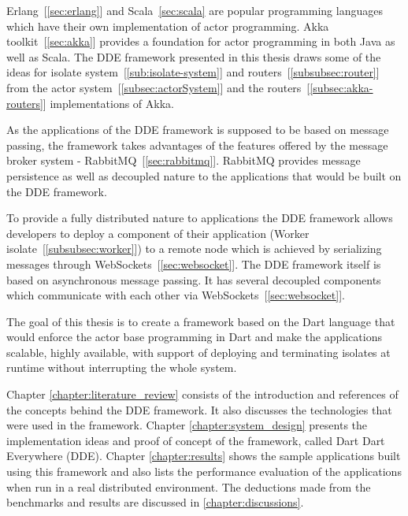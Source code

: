   Erlang~[\autoref{sec:erlang}] and Scala~\autoref{sec:scala} are popular programming languages which have their own implementation of actor programming. Akka toolkit~[\autoref{sec:akka}] provides a foundation for actor programming in both Java as well as Scala. The DDE framework presented in this thesis draws some of the ideas for
  isolate system~[\autoref{sub:isolate-system}] and routers~[\autoref{subsubsec:router}] from the actor system~[\autoref{subsec:actorSystem}] and the routers~[\autoref{subsec:akka-routers}] implementations of Akka.

  As the applications of the DDE framework is supposed to be based on message passing, the framework takes advantages of the features offered by the message broker system - RabbitMQ~[\autoref{sec:rabbitmq}]. RabbitMQ provides message persistence as well as decoupled nature to the applications that would be built on the DDE framework.

  To provide a fully distributed nature to applications the DDE framework allows developers to deploy a component of their application (Worker isolate~[\autoref{subsubsec:worker}]) to a remote node which is achieved by serializing messages through WebSockets~[\autoref{sec:websocket}]. The DDE framework itself is based on asynchronous message passing. It has several decoupled components which communicate with each other via WebSockets~[\autoref{sec:websocket}].

  The goal of this thesis is to create a framework based on the Dart language that would enforce the actor base programming in Dart and make the applications scalable, highly available, with support of deploying and terminating isolates at runtime without interrupting the whole system.

 Chapter \ref{chapter:literature_review} consists of the introduction and references of the concepts behind the DDE framework. It also discusses the technologies that were used in the framework. Chapter \ref{chapter:system_design} presents the implementation ideas and proof of concept of the framework, called Dart Dart Everywhere (DDE). Chapter \ref{chapter:results} shows the sample applications built using this framework and also lists the performance evaluation of the applications when run in a real distributed environment. The deductions made from the benchmarks and results are discussed in \autoref{chapter:discussions}.
